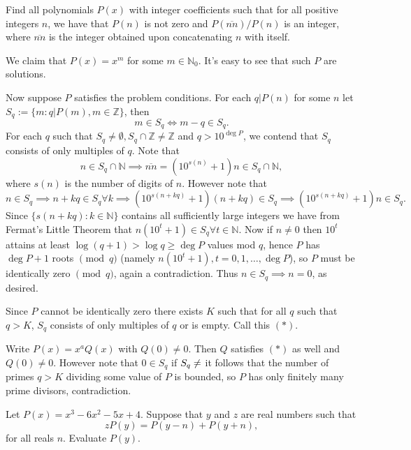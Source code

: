 \begin{question}[name={2020-2021 San Diego Power Contest, Winter, Day 1, \href{https://artofproblemsolving.com/community/c6h2415956p19854559}{Problem 4}}]
	Find all polynomials $P(x)$ with integer coefficients such that for all positive integers $n$, we have that $P(n)$ is not zero and ${P(\overline{nn})}/{P(n)}$ is an integer, where $\overline{nn}$ is the integer obtained upon concatenating $n$ with itself.
\end{question}


\begin{solution}[name={Solution by stroller}]
	We claim that $P(x) = x^m$ for some $m \in \mathbb N_0$. It's easy to see that such $P$ are solutions.
	
	Now suppose $P$ satisfies the problem conditions. For each $q | P(n)$ for some $n$ let $S_q := \{m: q|P(m), m \in \mathbb Z\}$, then $$m \in S_q \iff m-q \in S_q.$$ For each $q$ such that $S_q \ne \emptyset, S_q \cap \mathbb Z \ne \mathbb Z$ and $q > 10^{\deg P}$, we contend that $S_q$ consists of only multiples of $q$. Note that $$n\in S_q\cap \mathbb N \implies \overline{nn} = (10^{s(n)} + 1)n \in S_q\cap \mathbb N,$$ where $s(n)$ is the number of digits of $n$. However note that $$n\in S_q \implies n + kq \in S_q \forall k  \implies (10^{s(n+kq)}+1)(n+kq) \in S_q \implies (10^{s(n+kq)}+1)n \in S_q.$$ Since $\{s(n+kq): k \in \mathbb N\}$ contains all sufficiently large integers we have from Fermat's Little Theorem that $n(10^t + 1) \in S_q \forall t \in \mathbb N$. Now if $n \ne 0$ then $10^t$ attains at least $\log(q+1) > \log q \ge \deg P$ values mod $q$, hence $P$ has $\deg P + 1$ roots $\pmod q$ (namely $n(10^t + 1), t = 0,1,\dots,\deg P$), so $P$ must be identically zero $\pmod q$, again a contradiction. Thus $n \in S_q \implies n = 0$, as desired.
	
	Since $P$ cannot be identically zero there exists $K$ such that for all $q$ such that $q > K$, $S_q$ consists of only multiples of $q$ or is empty. Call this $(*)$.
	
	Write $P(x) = x^aQ(x)$ with $Q(0) \ne 0$. Then $Q$ satisfies $(*)$ as well and $Q(0) \ne 0$. However note that $0 \in S_q$ if $S_q \ne \empty$ it follows that the number of primes $q > K$ dividing some value of $P$ is bounded, so $P$ has only finitely many prime divisors, contradiction.
\end{solution}






\begin{question}[name={2020-21 CHMMC Winter, Individual Round, \href{https://artofproblemsolving.com/community/c126h2426223p20001828}{Problem 4}}]
	Let $P(x) = x^3 - 6x^2 - 5x + 4$. Suppose that $y$ and $z$ are real numbers such that
	\[ zP(y) = P(y - n) + P(y + n), \]for all reals $n$. Evaluate $P(y)$.
\end{question}





